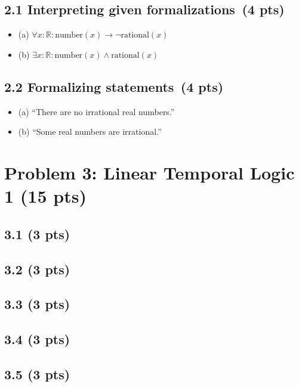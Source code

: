 \documentclass[11pt]{article}
\begin{document}
\subsection*{2.1 Interpreting given formalizations \,(4 pts)}
\begin{itemize}
    \item (a) \(\forall x : \mathbb{R} : \text{number}(x) \to \neg \text{rational}(x)\)
    \item (b) \(\exists x : \mathbb{R} : \text{number}(x) \wedge \text{rational}(x)\)
\end{itemize}

\subsection*{2.2 Formalizing statements \,(4 pts)}
\begin{itemize}
    \item (a) “There are no irrational real numbers.”
    \item (b) “Some real numbers are irrational.”
\end{itemize}

\newpage
\section{Problem 3: Linear Temporal Logic 1 (15 pts)}

\subsection*{3.1 (3 pts)}

\subsection*{3.2 (3 pts)}

\subsection*{3.3 (3 pts)}

\subsection*{3.4 (3 pts)}

\subsection*{3.5 (3 pts)}
\end{document}
